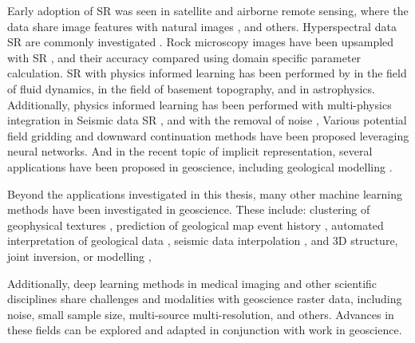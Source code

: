 \documentclass[manuscript.tex]{subfiles}
\begin{document}
Early adoption of SR was seen in satellite and airborne remote sensing, where the data share image features with natural images \parencite{lanarasSuperresolutionSentinel2Images2018,arunConvolutionalNetworkArchitectures2019,kawulokTrainingDeepNetworks2019}, and others.
Hyperspectral data SR are commonly investigated \parencite{yangHyperspectralImageClassification2018,arunCNNBasedSuperResolutionHyperspectral2020}. 
Rock microscopy images have been upsampled with SR \parencite{niuInnovativeApplicationGenerative2020}, and their accuracy compared using domain specific parameter calculation.
SR with physics informed learning has been performed by \textcite{bodeUsingPhysicsinformedEnhanced2021,jiangMeshfreeFlowNetPhysicsConstrainedDeep2020} in the field of fluid dynamics, \textcite{leongDeepBedMapDeepNeural2020} in the field of basement topography, and \textcite{jungbluthSingleframeSuperresolutionSolar2019} in astrophysics.
Additionally, physics informed learning has been performed with multi-physics integration in \textcite{degen3DMultiphysicsUncertainty2022}
Seismic data SR \parencite{liSuperresolutionSeismicVelocity2021}, and with the removal of noise \parencite{liDeepLearningSimultaneous2021}, 
Various potential field gridding \parencite{naprstekApplicationsMachineLearning2019,wangDeepLearningGravity2019a} and downward continuation methods \parencite{liStableDownwardContinuation2023,yeHighprecisionDownwardContinuation2022} have been proposed leveraging neural networks.
And in the recent topic of implicit representation, several applications have been proposed in geoscience, including geological modelling \textcite{hillierGeoINRImplicitNeural2023}.

Beyond the applications investigated in this thesis, many other machine learning methods have been investigated in geoscience.
These include: clustering of geophysical textures \parencite{grujicGeophysicsNeuralNetworks2019}, prediction of geological map event history \parencite{guo3DGeologicalStructure2021}, automated interpretation of geological data \parencite{waldelandConvolutionalNeuralNetworks2018, babakhinSemisupervisedSegmentationSalt2019,dawsonImpactDatasetSize2023}, seismic data interpolation \parencite{wangDeeplearningbasedSeismicData2018}, and 3D structure, joint inversion, or modelling \parencite{guo3DGeologicalStructure2021,zhihouJointGravityGravity2021},

Additionally, deep learning methods in medical imaging and other scientific disciplines share challenges and modalities with geoscience raster data, including noise, small sample size, multi-source multi-resolution, and others.
Advances in these fields can be explored and adapted in conjunction with work in geoscience.
\end{document}
